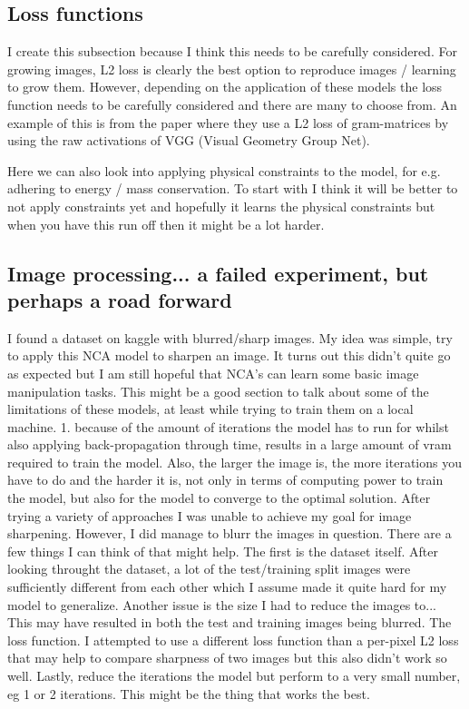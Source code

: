 \documentclass{article}
\begin{document}
\subsection*{Loss functions}
	I create this subsection because I think this needs to be carefully considered. For growing images, L2 loss is clearly the best option to reproduce images / learning to grow them. However, depending on the application of these models the loss function needs to be carefully considered and there are many to choose from. An example of this is from the paper \cite[Self-Organizing Textures]{niklasson2021self-organising} where they use a L2 loss of gram-matrices by using the raw activations of VGG (Visual Geometry Group Net).
	
	Here we can also look into applying physical constraints to the model, for e.g. adhering to energy / mass conservation. To start with I think it will be better to not apply constraints yet and hopefully it learns the physical constraints but when you have this run off then it might be a lot harder.

\subsection*{Image processing... a failed experiment, but perhaps a road forward}
	I found a dataset on kaggle with blurred/sharp images. My idea was simple, try to apply this NCA model to sharpen an image. It turns out this didn't quite go as expected but I am still hopeful that NCA's can learn some basic image manipulation tasks. This might be a good section to talk about some of the limitations of these models, at least while trying to train them on a local machine. 1. because of the amount of iterations the model has to run for whilst also applying back-propagation through time, results in a large amount of vram required to train the model. Also, the larger the image is, the more iterations you have to do and the harder it is, not only in terms of computing power to train the model, but also for the model to converge to the optimal solution. After trying a variety of approaches I was unable to achieve my goal for image sharpening. However, I did manage to blurr the images in question. There are a few things I can think of that might help. The first is the dataset itself. After looking throught the dataset, a lot of the test/training split images were sufficiently different from each other which I assume made it quite hard for my model to generalize. Another issue is the size I had to reduce the images to... This may have resulted in both the test and training images being blurred. The loss function. I attempted to use a different loss function than a per-pixel L2 loss that may help to compare sharpness of two images but this also didn't work so well. Lastly, reduce the iterations the model but perform to a very small number, eg 1 or 2 iterations. This might be the thing that works the best.
\end{document}
